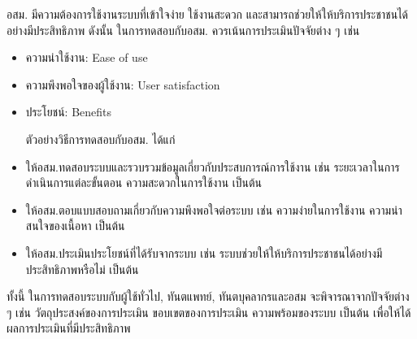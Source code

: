 อสม. มีความต้องการใช้งานระบบที่เข้าใจง่าย ใช้งานสะดวก และสามารถช่วยให้ให้บริการประชาชนได้อย่างมีประสิทธิภาพ ดังนั้น ในการทดสอบกับอสม. ควรเน้นการประเมินปัจจัยต่าง ๆ เช่น
\begin{itemize}
\item ความน่าใช้งาน: Ease of use
\item ความพึงพอใจของผู้ใช้งาน: User satisfaction
\item ประโยชน์: Benefits



ตัวอย่างวิธีการทดสอบกับอสม. ได้แก่

\item ให้อสม.ทดสอบระบบและรวบรวมข้อมูลเกี่ยวกับประสบการณ์การใช้งาน เช่น ระยะเวลาในการดำเนินการแต่ละขั้นตอน ความสะดวกในการใช้งาน เป็นต้น
\item ให้อสม.ตอบแบบสอบถามเกี่ยวกับความพึงพอใจต่อระบบ เช่น ความง่ายในการใช้งาน ความน่าสนใจของเนื้อหา เป็นต้น
\item ให้อสม.ประเมินประโยชน์ที่ได้รับจากระบบ เช่น ระบบช่วยให้ให้บริการประชาชนได้อย่างมีประสิทธิภาพหรือไม่ เป็นต้น
\end{itemize}
ทั้งนี้ ในการทดสอบระบบกับผู้ใช้ทั่วไป, ทันตแพทย์, ทันตบุคลากรและอสม จะพิจารณาจากปัจจัยต่าง ๆ เช่น วัตถุประสงค์ของการประเมิน ขอบเขตของการประเมิน ความพร้อมของระบบ เป็นต้น เพื่อให้ได้ผลการประเมินที่มีประสิทธิภาพ
